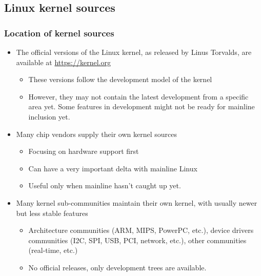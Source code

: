 \subsection{Linux kernel sources}

\begin{frame}
  \frametitle{Location of kernel sources}
  \begin{itemize}
  \item The official versions of the Linux kernel, as released by Linus
    Torvalds, are available at \url{https://kernel.org}
    \begin{itemize}
    \item These versions follow the development model of the kernel
    \item However, they may not contain the latest development from a
      specific area yet. Some features in development might not be
      ready for mainline inclusion yet.
    \end{itemize}
  \item Many chip vendors supply their own kernel sources
    \begin{itemize}
    \item Focusing on hardware support first
    \item Can have a very important delta with mainline Linux
    \item Useful only when mainline hasn't caught up yet.
    \end{itemize}
  \item Many kernel sub-communities maintain their own kernel, with
    usually newer but less stable features
    \begin{itemize}
    \item Architecture communities (ARM, MIPS, PowerPC, etc.), device
      drivers communities (I2C, SPI, USB, PCI, network, etc.), other
      communities (real-time, etc.)
    \item No official releases, only development trees are available.
    \end{itemize}
  \end{itemize}
\end{frame}

